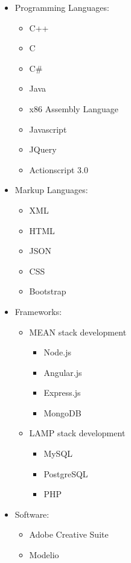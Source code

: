 \documentclass[12pt,a4paper]{article}
\begin{document}
		\begin{itemize}
			\item Programming Languages:
			\begin {itemize}
				\item C++
				\item C
				\item C\#
				\item Java
				\item x86 Assembly Language
				\item Javascript
				\item JQuery
				\item Actionscript 3.0
			\end {itemize}
			\item Markup Languages:
			\begin {itemize}
				\item XML
				\item HTML
				\item JSON
				\item CSS
				\item Bootstrap
			\end {itemize}
			\item Frameworks:
			\begin {itemize}
				\item MEAN stack development
				\begin {itemize}
					\item Node.js
					\item Angular.js
					\item Express.js
					\item MongoDB
				\end {itemize}
				\item LAMP stack development
				\begin {itemize}
					\item MySQL
					\item PostgreSQL
					\item PHP
				\end {itemize}
			\end {itemize}
			\item Software:
			\begin {itemize}
				\item Adobe Creative Suite
				\item Modelio
			\end {itemize}


		\end{itemize}
		
\end{document}
